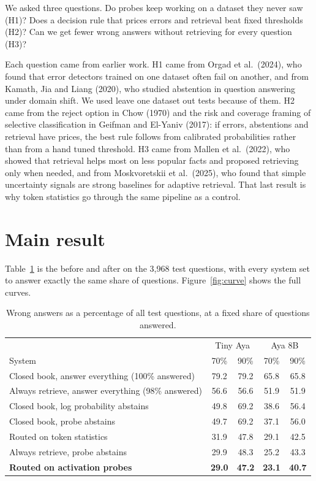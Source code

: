 \documentclass[11pt,a4paper]{article}
\begin{document}
We asked three questions. Do probes keep working on a dataset they never saw (H1)? Does a decision rule that prices errors and retrieval beat fixed thresholds (H2)? Can we get fewer wrong answers without retrieving for every question (H3)?

Each question came from earlier work. H1 came from Orgad et al.\ (2024), who found that error detectors trained on one dataset often fail on another, and from Kamath, Jia and Liang (2020), who studied abstention in question answering under domain shift. We used leave one dataset out tests because of them. H2 came from the reject option in Chow (1970) and the risk and coverage framing of selective classification in Geifman and El-Yaniv (2017): if errors, abstentions and retrieval have prices, the best rule follows from calibrated probabilities rather than from a hand tuned threshold. H3 came from Mallen et al.\ (2022), who showed that retrieval helps most on less popular facts and proposed retrieving only when needed, and from Moskvoretskii et al.\ (2025), who found that simple uncertainty signals are strong baselines for adaptive retrieval. That last result is why token statistics go through the same pipeline as a control.

\section{Main result}

Table~\ref{tab:main} is the before and after on the 3,968 test questions, with every system set to answer exactly the same share of questions. Figure~\ref{fig:curve} shows the full curves.

\begin{table}[h]
\centering\small
\caption{Wrong answers as a percentage of all test questions, at a fixed share of questions answered.}
\label{tab:main}
\begin{tabular}{lcccc}
\toprule
 & \multicolumn{2}{c}{Tiny Aya} & \multicolumn{2}{c}{Aya 8B}\\
System & 70\% & 90\% & 70\% & 90\%\\
\midrule
Closed book, answer everything (100\% answered) & 79.2 & 79.2 & 65.8 & 65.8\\
Always retrieve, answer everything (98\% answered) & 56.6 & 56.6 & 51.9 & 51.9\\
Closed book, log probability abstains & 49.8 & 69.2 & 38.6 & 56.4\\
Closed book, probe abstains & 49.7 & 69.2 & 37.1 & 56.0\\
Routed on token statistics & 31.9 & 47.8 & 29.1 & 42.5\\
Always retrieve, probe abstains & 29.9 & 48.3 & 25.2 & 43.3\\
\textbf{Routed on activation probes} & \textbf{29.0} & \textbf{47.2} & \textbf{23.1} & \textbf{40.7}\\
\bottomrule
\end{tabular}
\end{table}
\end{document}
